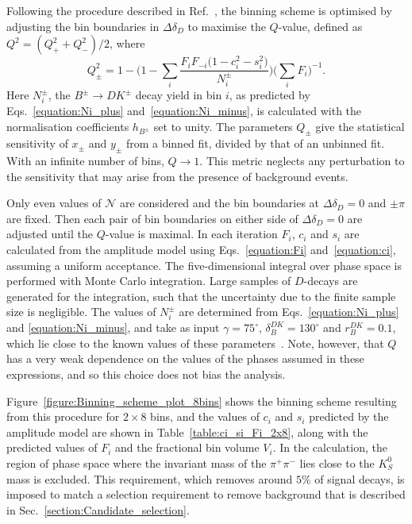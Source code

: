 \documentclass[12pt, a4paper, notitlepage, onecolumn]{article}
\begin{document}
Following the procedure described in Ref.~\cite{HarnewS4pi}, the binning scheme is optimised by adjusting the bin boundaries in $\Delta \delta_D$ to maximise the $Q$-value, 
 defined as $Q^2 = (Q_+^2 + Q_-^2)/2$, where
\begin{equation}
    Q_\pm^2 = 1 - \Big(1 - \sum_i\frac{F_iF_{-i}\big(1 - c_i^2 - s_i^2\big)}{N_{i}^\pm}\Big)\Big(\sum_iF_i\Big)^{-1}.
    \label{equation:Qvalue}
\end{equation}
Here $N_i^\pm$, the $B^\pm \to DK^\pm$ decay yield in bin $i$, as predicted by Eqs.~\eqref{equation:Ni_plus} and~\eqref{equation:Ni_minus}, is calculated with the normalisation coefficients $h_{B^\pm}$ set to unity. The parameters $Q_{\pm}$ give the statistical sensitivity of $x_\pm$ and $y_\pm$ from a binned fit, divided by that of an unbinned fit. With an infinite number of bins, $Q\to 1$. This metric neglects any perturbation to the sensitivity that may arise from the presence of background events.

Only even values of $\mathcal{N}$ are considered and the bin boundaries at $\Delta\delta_D = 0$ and $\pm\pi$ are fixed. Then each pair of bin boundaries on either side of $\Delta\delta_D = 0$ are adjusted until the $Q$-value is maximal. In each iteration $F_i$, $c_i$ and $s_i$  are calculated from the amplitude model using Eqs.~\eqref{equation:Fi} and~\eqref{equation:ci}, assuming a uniform acceptance. The five-dimensional integral over phase space is performed with Monte Carlo integration. Large samples of $D$-decays are generated for the integration, such that the uncertainty due to the finite sample size is negligible. The values of $N_i^\pm$ are determined from Eqs.~\eqref{equation:Ni_plus} and \eqref{equation:Ni_minus}, and take as input $\gamma = 75^\circ$, $\delta^{DK}_B = 130^\circ$ and $r^{DK}_B = 0.1$, which lie close to the known values of these parameters~\cite{LHCb-PAPER-2021-033}. Note, however, that $Q$ has a very weak dependence on the values of the phases assumed in these expressions, and so this choice does not bias the analysis.

Figure~\ref{figure:Binning_scheme_plot_8bins} shows the binning scheme resulting from this procedure for $2 \times 8$ bins, and the values of $c_i$ and $s_i$ predicted by the amplitude model are shown in Table~\ref{table:ci_si_Fi_2x8}, along with the predicted values of $F_i$ and the fractional bin volume $V_i$. In the calculation, the region of phase space where the invariant mass of the $\pi^+\pi^-$ lies close to the $K^0_S$ mass is excluded. This requirement, which removes around $5\%$ of signal decays, is imposed to match a selection requirement to remove background that is described in Sec.~\ref{section:Candidate_selection}.
\end{document}
